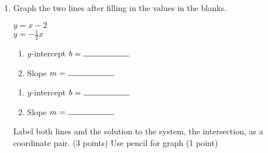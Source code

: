 \documentclass[12pt, twoside]{article}
\begin{document}
\begin{enumerate}
    \newpage
    \item Graph the two lines after filling in the values in the blanks.\\[0.5cm]


    \begin{multicols}{2}
      $y= x -2$ \\
      $y=-\frac{1}{2} x $
    \end{multicols}
    \begin{multicols}{2}
      \raggedcolumns
      \begin{enumerate}
        \item $y$-intercept $b= \rule{2cm}{0.15mm}$ \\[0.5cm]
        \item Slope \hspace{0.7cm} $m= \rule{2cm}{0.15mm}$\\[0.5cm]
      \end{enumerate}
      \begin{enumerate}
        \item $y$-intercept $b= \rule{2cm}{0.15mm}$ \\[0.5cm]
        \item Slope \hspace{0.7cm} $m= \rule{2cm}{0.15mm}$\\[0.5cm]
      \end{enumerate}
    \end{multicols}

    Label both lines and the solution to the system, the intersection, as a coordinate pair. (3 points) Use pencil for graph (1 point)\\

    \begin{center} %
    \end{center}

\end{enumerate}
\newpage
\setcounter{page}{1}
\end{document}
